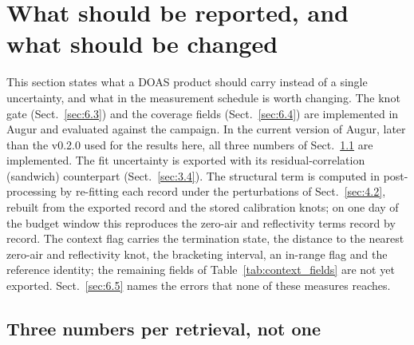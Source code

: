 \section{What should be reported, and what should be changed}
\label{sec:6}

This section states what a DOAS product should carry instead of a single uncertainty, and what in the measurement
schedule is worth changing. The knot gate (Sect.~\ref{sec:6.3}) and the coverage fields (Sect.~\ref{sec:6.4}) are
implemented in Augur and evaluated against the campaign. In the current version of Augur, later than the v0.2.0 used
for the results here, all three numbers of Sect.~\ref{sec:6.1} are implemented.
The fit uncertainty is exported with its residual-correlation (sandwich) counterpart (Sect.~\ref{sec:3.4}). The
structural term is computed in post-processing by re-fitting each record under the perturbations of
Sect.~\ref{sec:4.2}, rebuilt from the exported record and the stored calibration knots; on one day of the budget
window this reproduces the zero-air and reflectivity terms record by record. The context flag carries the termination
state, the distance to the nearest zero-air and reflectivity knot, the bracketing interval, an in-range flag and the
reference identity; the remaining fields of Table~\ref{tab:context_fields} are not yet exported.
Sect.~\ref{sec:6.5} names the errors that none of these measures reaches.

\subsection{Three numbers per retrieval, not one}
\label{sec:6.1}

